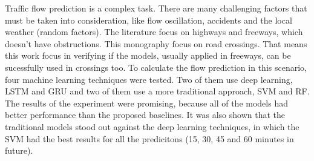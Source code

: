 Traffic flow prediction is a complex task. There are many challenging factors that must be taken into consideration, like flow oscillation, accidents and the local weather (random factors). The literature focus on highways and freeways, which doesn't have obstructions. This monography focus on road crossings. That means this work focus in verifying if the models, usually applied in freeways, can be sucessfully used in crossings too. To calculate the flow prediction in this scenario, four machine learning techniques were tested. Two of them use deep learning, \acrfull{LSTM} and \acrfull{GRU} and two of them use a more traditional approach, \acrfull{SVM} and \acrfull{RF}. The results of the experiment were promising, because all of the models had better performance than the proposed baselines. It was also shown that the traditional models stood out against the deep learning techniques, in which the \acrfull{SVM} had the best results for all the predicitons (15, 30, 45 and 60 minutes in future).

